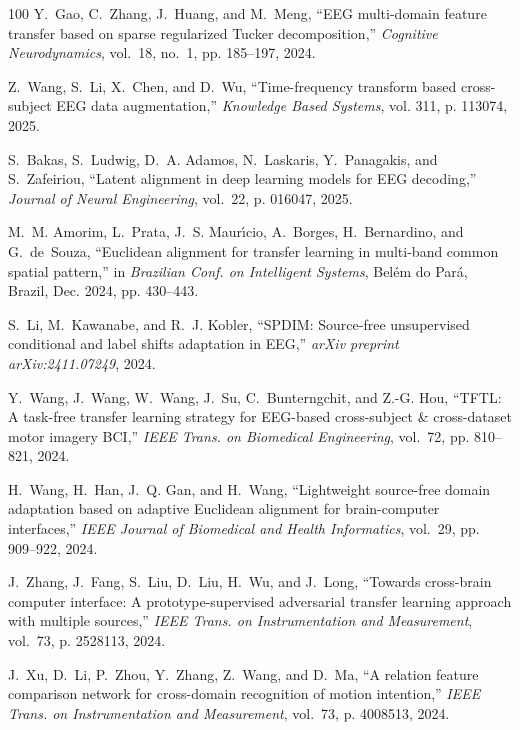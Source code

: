 \documentclass[journal]{IEEEtran}
\begin{document}
\begin{thebibliography}{100}
Y.~Gao, C.~Zhang, J.~Huang, and M.~Meng, ``{EEG} multi-domain feature transfer
  based on sparse regularized {Tucker} decomposition,'' \emph{Cognitive
  Neurodynamics}, vol.~18, no.~1, pp. 185--197, 2024.

Z.~Wang, S.~Li, X.~Chen, and D.~Wu, ``Time-frequency transform based
  cross-subject {EEG} data augmentation,'' \emph{Knowledge Based Systems}, vol.
  311, p. 113074, 2025.

S.~Bakas, S.~Ludwig, D.~A. Adamos, N.~Laskaris, Y.~Panagakis, and S.~Zafeiriou,
  ``Latent alignment in deep learning models for {EEG} decoding,''
  \emph{Journal of Neural Engineering}, vol.~22, p. 016047, 2025.

M.~M. Amorim, L.~Prata, J.~S. Maur{\'\i}cio, A.~Borges, H.~Bernardino, and
  G.~de~Souza, ``Euclidean alignment for transfer learning in multi-band common
  spatial pattern,'' in \emph{Brazilian Conf. on Intelligent Systems}, Belém
  do Pará, Brazil, Dec. 2024, pp. 430--443.

S.~Li, M.~Kawanabe, and R.~J. Kobler, ``{SPDIM}: {S}ource-free unsupervised
  conditional and label shifts adaptation in {EEG},'' \emph{arXiv preprint
  arXiv:2411.07249}, 2024.

Y.~Wang, J.~Wang, W.~Wang, J.~Su, C.~Bunterngchit, and Z.-G. Hou, ``{TFTL}: {A}
  task-free transfer learning strategy for {EEG}-based cross-subject \&
  cross-dataset motor imagery {BCI},'' \emph{IEEE Trans. on Biomedical
  Engineering}, vol.~72, pp. 810--821, 2024.

H.~Wang, H.~Han, J.~Q. Gan, and H.~Wang, ``Lightweight source-free domain
  adaptation based on adaptive {Euclidean} alignment for brain-computer
  interfaces,'' \emph{IEEE Journal of Biomedical and Health Informatics},
  vol.~29, pp. 909--922, 2024.

J.~Zhang, J.~Fang, S.~Liu, D.~Liu, H.~Wu, and J.~Long, ``Towards cross-brain
  computer interface: {A} prototype-supervised adversarial transfer learning
  approach with multiple sources,'' \emph{IEEE Trans. on Instrumentation and
  Measurement}, vol.~73, p. 2528113, 2024.

J.~Xu, D.~Li, P.~Zhou, Y.~Zhang, Z.~Wang, and D.~Ma, ``A relation feature
  comparison network for cross-domain recognition of motion intention,''
  \emph{IEEE Trans. on Instrumentation and Measurement}, vol.~73, p. 4008513,
  2024.


\end{thebibliography}
\end{document}
